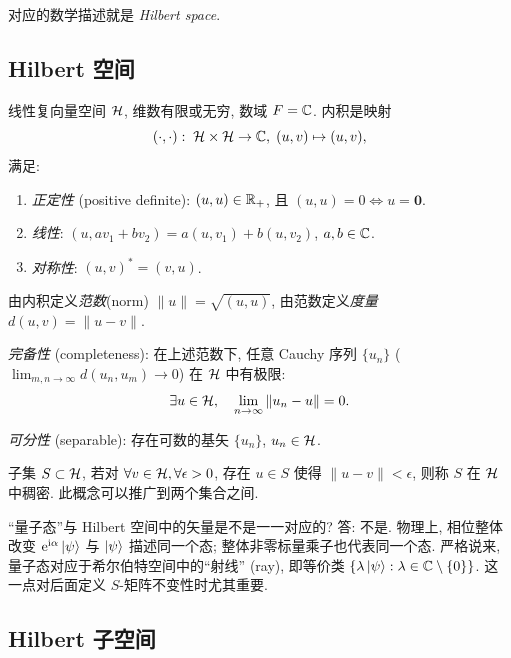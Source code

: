 对应的数学描述就是 \emph{Hilbert space}.

\subsection{Hilbert 空间}\label{subsec:hilbert-space}

\begin{definition}[Hilbert 空间]
线性复向量空间 $\mathcal{H}$, 维数有限或无穷, 数域 $F=\mathbb{C}$. 内积是映射
\[(\cdot,\cdot):\;\mathcal{H}\times\mathcal{H}\to\mathbb{C},\;(u,v)\mapsto (u,v),\]
满足:
\begin{enumerate}
    \item \emph{正定性} (positive definite): $(u,u)\in\mathbb{R}_{+}$, 且 $(u,u)=0\Leftrightarrow u=\mathbf 0$.
    \item \emph{线性}: $(u,av_1+bv_2)=a(u,v_1)+b(u,v_2)$, $a,b\in\mathbb{C}$.
    \item \emph{对称性}: $(u,v)^{*}=(v,u)$.
\end{enumerate}
由内积定义\emph{范数}(norm) $\|u\|=\sqrt{(u,u)}$, 由范数定义\emph{度量} $d(u,v)=\|u-v\|$.

\emph{完备性} (completeness): 在上述范数下, 任意 Cauchy 序列 $\{u_n\}$ ($\lim_{m,n\to\infty}d(u_n,u_m)\to 0$) 在 $\mathcal{H}$ 中有极限:
\begin{equation}
\exists u\in\mathcal{H},\quad \lim_{n\to\infty}\|u_n-u\|=0.
\end{equation}

\emph{可分性} (separable): 存在可数的基矢 $\{u_n\}$, $u_n\in\mathcal{H}$.
\end{definition}

\begin{definition}[稠密子集]
子集 $S\subset\mathcal{H}$, 若对 $\forall v\in\mathcal{H}, \forall \epsilon>0$, 存在 $u\in S$ 使得 $\|u-v\|<\epsilon$, 则称 $S$ 在 $\mathcal{H}$ 中稠密. 此概念可以推广到两个集合之间.
\end{definition}

\begin{remark}
``量子态''与 Hilbert 空间中的矢量是不是一一对应的?  答: 不是. 物理上, 相位整体改变 $\mathrm{e}^{\mathrm{i}\alpha}\ket\psi$ 与 $\ket\psi$ 描述同一个态; 整体非零标量乘子也代表同一个态. 严格说来, 量子态对应于希尔伯特空间中的``射线'' (ray), 即等价类 $\{\lambda\ket\psi:\lambda\in\mathbb{C}\setminus\{0\}\}$. 这一点对后面定义 $S$-矩阵不变性时尤其重要.
\end{remark}

\subsection{Hilbert 子空间}\label{subsec:subhilbert}

